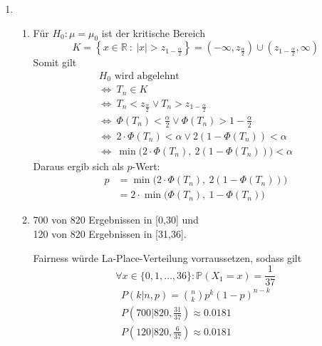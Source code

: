 \documentclass[a4paper]{scrartcl}
\newcommand{\gdw}{\Leftrightarrow}
\def \blattnr {9}
\begin{document}
\begin{enumerate}[label=\bfseries \blattnr.\arabic*]
    \item 
        \begin{enumerate}
            \item
                Für $H_0\colon \mu = \mu_0$ ist der kritische Bereich
                \begin{equation*}
                    K = \left\{
                            x \in \mathbb{R}\ :\ 
                            |x| > z_{1-\frac{\alpha}{2}}
                    \right\}
                    = \left( -\infty, z_{\frac{\alpha}{2}} \right) \cup
                    \left( z_{1-\frac{\alpha}{2}}, \infty \right)
                \end{equation*}
                Somit gilt
                \begin{gather*}
                    H_0 \text{ wird abgelehnt} \\
                    \gdw\ T_n \in K \\
                    \gdw\ T_n < z_{\frac{\alpha}{2}} \lor T_n > z_{1-\frac{\alpha}{2}} \\
                    \gdw\ \Phi(T_n) < \frac{\alpha}{2} \lor \Phi(T_n) > 1-\frac{\alpha}{2} \\
                    \gdw\ 2 \cdot \Phi(T_n) < \alpha \lor 2(1-\Phi(T_n)) < \alpha \\
                    \gdw\ \min \Big(2 \cdot \Phi(T_n),\ 2(1-\Phi(T_n)) \Big) < \alpha
                \end{gather*}
                Daraus ergib sich als $p$-Wert:
                \begin{equation*}
	                \begin{split}
	                    p 
                        &= \min \Big(2 \cdot \Phi(T_n),\ 2(1-\Phi(T_n)) \Big) \\
                        &= 2 \cdot \min \Big(\Phi(T_n),\ 1-\Phi(T_n) \Big)
	                \end{split}
	            \end{equation*}
       
       \item 
        700 von 820 Ergebnissen in [0,30] und \\
	120 von 820 Ergebnissen in [31,36].
	
	Fairness würde La-Place-Verteilung vorraussetzen, sodass gilt \\
	$$\forall x \in \{0,1,\ldots,36\}: \mathbb{P}(X_1 = x) = \frac1{37}$$
	\begin{equation*}
	  \begin{split}
	    P(k|n,p) = \binom{n}{k} p^ k(1-p)^{n-k} \\
	    P\left(700|820,\frac{31}{37}\right) \approx 0.0181 \\ 
	    P\left(120|820,\frac{6}{37}\right) \approx 0.0181
	  \end{split}
	\end{equation*}
	

\end{enumerate}
\end{enumerate}
\end{document}
